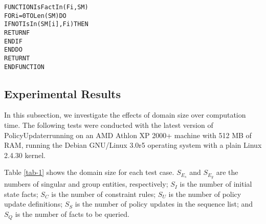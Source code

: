 \documentclass[glov2,twocolumn,final]{svjour2}
\newenvironment{vverbatim}
  {\begin{alltt}}
  {\vspace{-\baselineskip}\end{alltt}}
\begin{document}
        \begin{vverbatim}
FUNCTION IsFactIn(Fi, SM)
  FOR i = 0 TO Len(SM) DO
    IF NOT IsIn(SM[i], Fi) THEN
      RETURN F
    ENDIF
  ENDDO
  RETURN T
ENDFUNCTION
        \end{vverbatim}

    \subsection{Experimental Results}

      In this subsection, we investigate the effects of domain size over
      computation time. The following tests were conducted with the latest
      version of PolicyUpdater\footnotemark running on an AMD Athlon
      XP 2000+ machine with 512 MB of RAM, running the Debian GNU/Linux 3.0r5
      operating system with a plain Linux 2.4.30 kernel.


      Table \ref{tab-1} shows the domain size for each test case. $S_{E_{s}}$
      and $S_{E_{g}}$ are the numbers of singular and group entities,
      respectively; $S_{I}$ is the number of initial state facts; $S_{C}$ is
      the number of constraint rules; $S_{U}$ is the number of policy update
      definitions; $S_{S}$ is the number of policy updates in the sequence
      list; and $S_{Q}$ is the number of facts to be queried.
\end{document}
